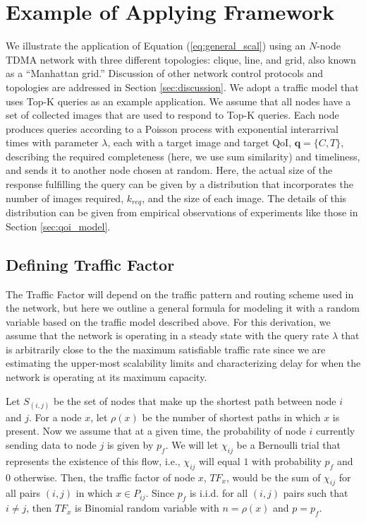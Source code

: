 \section{Example of Applying Framework}
\label{sec:example_applications}

We illustrate the application of Equation (\ref{eq:general_scal}) using an $N$-node TDMA network with three different topologies: clique, line, and grid, also known as a ``Manhattan grid.''  Discussion of other network control protocols and topologies are addressed in Section \ref{sec:discussion}.  We adopt a traffic model that uses Top-K queries as an example application.  We assume that all nodes have a set of collected images that are used to respond to Top-K queries.  Each node produces queries according to a Poisson process with exponential interarrival times with parameter $\lambda$, each with a target image and target QoI, $\mathbf{q} = \{C, T\}$, describing the required completeness (here, we use sum similarity) and timeliness, and sends it to another node chosen at random.  Here, the actual size of the response fulfilling the query can be given by a distribution that incorporates the number of images required, $k_{req}$, and the size of each image.  The details of this distribution can be given from empirical observations of experiments like those in Section \ref{sec:qoi_model}.

\subsection{Defining Traffic Factor}
\label{sec:def_tf}
The Traffic Factor will depend on the traffic pattern and routing scheme used in the network, but here we outline a general formula for modeling it with a random variable based on the traffic model described above.  For this derivation, we assume that the network is operating in a steady state with the query rate $\lambda$ that is arbitrarily close to the the maximum satisfiable traffic rate since we are estimating the upper-most scalability limits and characterizing delay for when the network is operating at its maximum capacity. 

Let $S_{(i,j)}$ be the set of nodes that make up the shortest path between node $i$ and $j$. For a node $x$, let $\rho(x)$ be the number of shortest paths in which $x$ is present. Now we assume that at a given time, the probability of node $i$ currently sending data to node $j$ is given by $p_f$. 
We will let $\chi_{ij}$ be a Bernoulli trial that represents the existence of this flow, i.e., $\chi_{ij}$ will equal $1$ with probability $p_f$ and $0$ otherwise. Then, the traffic factor of node $x$, $TF_x$, would be the sum of $\chi_{ij}$ for all pairs $(i,j)$ in which $x \in P_{ij}$. Since $p_f$ is i.i.d. for all $(i,j)$ pairs such that $i \neq j$, then $TF_x$ is Binomial random variable with $n=\rho(x)$ and $p=p_{f}$.

